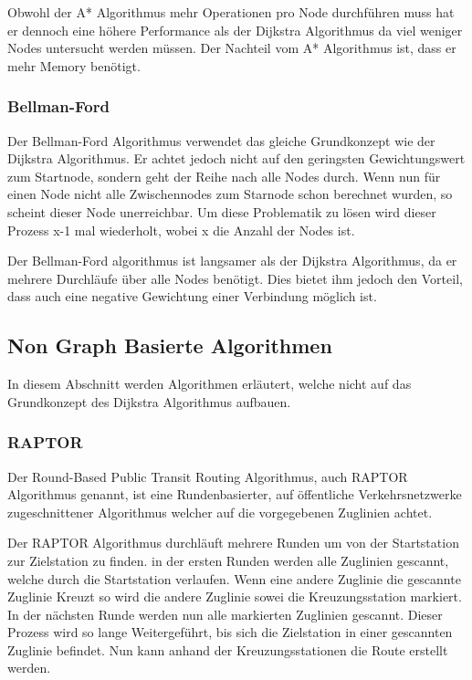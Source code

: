 Obwohl der A* Algorithmus mehr Operationen pro Node durchführen muss hat er dennoch eine höhere Performance als der Dijkstra Algorithmus da viel weniger Nodes untersucht werden müssen. Der Nachteil vom A* Algorithmus ist, dass er mehr Memory benötigt.

\subsubsection{Bellman-Ford}
\label{subsubsec:Bellman-Ford}
Der Bellman-Ford Algorithmus verwendet das gleiche Grundkonzept wie der Dijkstra Algorithmus. Er achtet jedoch nicht auf den geringsten Gewichtungswert zum Startnode, sondern geht der Reihe nach alle Nodes durch. Wenn nun für einen Node nicht alle Zwischennodes zum Starnode schon berechnet wurden, so scheint dieser Node unerreichbar. Um diese Problematik zu lösen wird dieser Prozess x-1 mal wiederholt, wobei x die Anzahl der Nodes ist. \vspace{0.5cm}

Der Bellman-Ford algorithmus ist langsamer als der Dijkstra Algorithmus, da er mehrere Durchläufe über alle Nodes benötigt. Dies bietet ihm jedoch den Vorteil, dass auch eine negative Gewichtung einer Verbindung möglich ist.

\subsection{Non Graph Basierte Algorithmen}
\label{subsec:Non Graph Basierte Algorithmen}
In diesem Abschnitt werden Algorithmen erläutert, welche nicht auf das Grundkonzept des Dijkstra Algorithmus aufbauen.

\subsubsection{RAPTOR}
\label{subsubsec:RAPTOR}
Der Round-Based Public Transit Routing Algorithmus, auch RAPTOR Algorithmus genannt, ist eine Rundenbasierter, auf öffentliche Verkehrsnetzwerke zugeschnittener Algorithmus welcher auf die vorgegebenen Zuglinien achtet. \vspace{0.5cm}

Der RAPTOR Algorithmus durchläuft mehrere Runden um von der Startstation zur Zielstation zu finden. in der ersten Runden werden alle Zuglinien gescannt, welche durch die Startstation verlaufen. Wenn eine andere Zuglinie die gescannte Zuglinie Kreuzt so wird die andere Zuglinie sowei die Kreuzungsstation markiert. In der nächsten Runde werden nun alle markierten Zuglinien gescannt. Dieser Prozess wird so lange Weitergeführt, bis sich die Zielstation in einer gescannten Zuglinie befindet. Nun kann anhand der Kreuzungsstationen die Route erstellt werden. \vspace{0.5cm}

